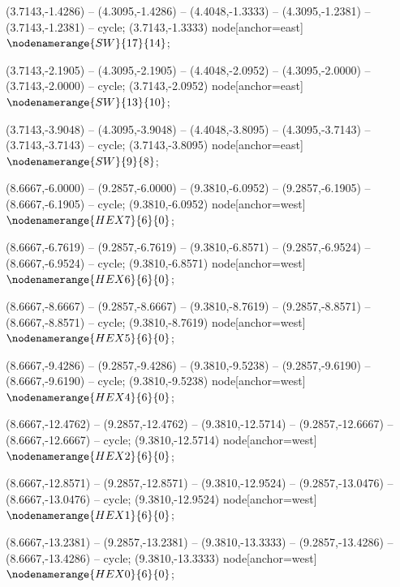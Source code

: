    (3.7143,-1.4286) -- (4.3095,-1.4286) -- (4.4048,-1.3333) -- (4.3095,-1.2381) -- (3.7143,-1.2381) -- cycle;
   (3.7143,-1.3333) node[anchor=east] {$\nodenamerange{SW}{17}{14}$};

   (3.7143,-2.1905) -- (4.3095,-2.1905) -- (4.4048,-2.0952) -- (4.3095,-2.0000) -- (3.7143,-2.0000) -- cycle;
   (3.7143,-2.0952) node[anchor=east] {$\nodenamerange{SW}{13}{10}$};

   (3.7143,-3.9048) -- (4.3095,-3.9048) -- (4.4048,-3.8095) -- (4.3095,-3.7143) -- (3.7143,-3.7143) -- cycle;
   (3.7143,-3.8095) node[anchor=east] {$\nodenamerange{SW}{9}{8}$};

   (8.6667,-6.0000) -- (9.2857,-6.0000) -- (9.3810,-6.0952) -- (9.2857,-6.1905) -- (8.6667,-6.1905) -- cycle;
   (9.3810,-6.0952) node[anchor=west] {$\nodenamerange{HEX7}{6}{0}$};

   (8.6667,-6.7619) -- (9.2857,-6.7619) -- (9.3810,-6.8571) -- (9.2857,-6.9524) -- (8.6667,-6.9524) -- cycle;
   (9.3810,-6.8571) node[anchor=west] {$\nodenamerange{HEX6}{6}{0}$};

   (8.6667,-8.6667) -- (9.2857,-8.6667) -- (9.3810,-8.7619) -- (9.2857,-8.8571) -- (8.6667,-8.8571) -- cycle;
   (9.3810,-8.7619) node[anchor=west] {$\nodenamerange{HEX5}{6}{0}$};

   (8.6667,-9.4286) -- (9.2857,-9.4286) -- (9.3810,-9.5238) -- (9.2857,-9.6190) -- (8.6667,-9.6190) -- cycle;
   (9.3810,-9.5238) node[anchor=west] {$\nodenamerange{HEX4}{6}{0}$};

   (8.6667,-12.4762) -- (9.2857,-12.4762) -- (9.3810,-12.5714) -- (9.2857,-12.6667) -- (8.6667,-12.6667) -- cycle;
   (9.3810,-12.5714) node[anchor=west] {$\nodenamerange{HEX2}{6}{0}$};

   (8.6667,-12.8571) -- (9.2857,-12.8571) -- (9.3810,-12.9524) -- (9.2857,-13.0476) -- (8.6667,-13.0476) -- cycle;
   (9.3810,-12.9524) node[anchor=west] {$\nodenamerange{HEX1}{6}{0}$};

   (8.6667,-13.2381) -- (9.2857,-13.2381) -- (9.3810,-13.3333) -- (9.2857,-13.4286) -- (8.6667,-13.4286) -- cycle;
   (9.3810,-13.3333) node[anchor=west] {$\nodenamerange{HEX0}{6}{0}$};

